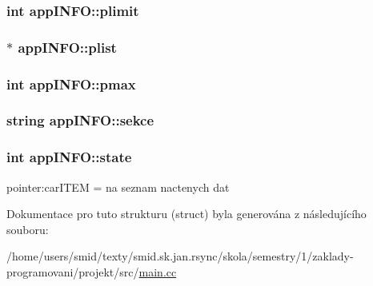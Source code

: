 \hypertarget{structappINFO_afff0bc6ce594cc74345e3641a0522ab8}{
\subsubsection[{plimit}]{\setlength{\rightskip}{0pt plus 5cm}int {\bf app\-I\-N\-F\-O\-::plimit}}}
\label{d3/d7d/structappINFO_afff0bc6ce594cc74345e3641a0522ab8}
\hypertarget{structappINFO_a7a03b4aba262b9a92ba934319c2d0c0e}{
\subsubsection[{plist}]{$\ast$ {\bf app\-I\-N\-F\-O\-::plist}}}
\label{d3/d7d/structappINFO_a7a03b4aba262b9a92ba934319c2d0c0e}
\hypertarget{structappINFO_a24c25ecb17d321f5cbb73df0a25fcf78}{
\subsubsection[{pmax}]{\setlength{\rightskip}{0pt plus 5cm}int {\bf app\-I\-N\-F\-O\-::pmax}}}
\label{d3/d7d/structappINFO_a24c25ecb17d321f5cbb73df0a25fcf78}
\hypertarget{structappINFO_a3deb9643e9aa5638f10183f79eda5876}{
\subsubsection[{sekce}]{\setlength{\rightskip}{0pt plus 5cm}string {\bf app\-I\-N\-F\-O\-::sekce}}}
\label{d3/d7d/structappINFO_a3deb9643e9aa5638f10183f79eda5876}
\hypertarget{structappINFO_a05aebd22f950eef36e212a5d647175dc}{
\subsubsection[{state}]{\setlength{\rightskip}{0pt plus 5cm}int {\bf app\-I\-N\-F\-O\-::state}}}
\label{d3/d7d/structappINFO_a05aebd22f950eef36e212a5d647175dc}


pointer\-:car\-I\-T\-E\-M = na seznam nactenych dat 



\-Dokumentace pro tuto strukturu (struct) byla generována z následujícího souboru\-:\begin{DoxyCompactItemize}
\item 
/home/users/smid/texty/smid.\-sk.\-jan.\-rsync/skola/semestry/1/zaklady-\/programovani/projekt/src/\hyperlink{main_8cc}{main.\-cc}\end{DoxyCompactItemize}

